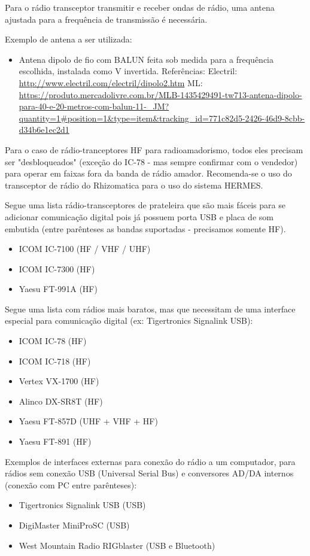\documentclass[11pt,a4paper]{article}
\begin{document}
Para o rádio transceptor transmitir e receber ondas de rádio, uma antena ajustada para a frequência de transmissão é necessária.

Exemplo de antena a ser utilizada:
\begin{itemize}
\item Antena dipolo de fio com BALUN feita sob medida para a frequência escolhida, instalada como V invertida. Referências: Electril:     \url{http://www.electril.com/electril/dipolo2.htm} ML: \url{https://produto.mercadolivre.com.br/MLB-1435429491-tw713-antena-dipolo-para-40-e-20-metros-com-balun-11-_JM?quantity=1#position=1&type=item&tracking_id=771c82d5-2426-46d9-8cbb-d34b6e1ec2d1}
\end{itemize}

Para o caso de rádio-tranceptores HF para radioamadorismo, todos eles precisam ser "desbloqueados" (exceção do IC-78 - mas sempre confirmar com o vendedor) para operar em faixas fora da banda de rádio amador. Recomenda-se o uso do transceptor de rádio do Rhizomatica para o uso do sistema HERMES.

Segue uma lista rádio-transceptores de prateleira que são mais fáceis para se adicionar comunicação digital pois já possuem porta USB e placa de som embutida (entre parênteses as bandas suportadas - precisamos somente HF).

\begin{itemize}
\item ICOM IC-7100 (HF / VHF / UHF)
\item ICOM IC-7300 (HF)
\item Yaesu FT-991A (HF)
\end{itemize}

Segue uma lista com rádios mais baratos, mas que necessitam de uma interface especial para comunicação digital (ex: Tigertronics Signalink USB):
\begin{itemize}
\item ICOM IC-78 (HF)
\item ICOM IC-718 (HF)
\item Vertex VX-1700 (HF)
\item Alinco DX-SR8T (HF)
\item Yaesu FT-857D (UHF + VHF + HF)
\item Yaesu FT-891 (HF)
\end{itemize}

Exemplos de interfaces externas para conexão do rádio a um computador, para rádios sem conexão USB (Universal Serial Bus) e conversores AD/DA internos (conexão com PC entre parênteses):
\begin{itemize}
\item Tigertronics Signalink USB (USB)
\item DigiMaster MiniProSC (USB)
\item West Mountain Radio RIGblaster (USB e Bluetooth)
\end{itemize}
\end{document}
